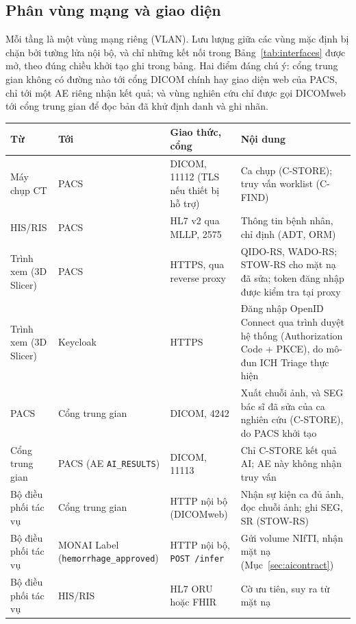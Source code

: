\subsection{Phân vùng mạng và giao diện}
\label{sec:network}

Mỗi tầng là một vùng mạng riêng (VLAN). Lưu lượng giữa các vùng mặc định bị chặn bởi
tường lửa nội bộ, và chỉ những kết nối trong Bảng~\ref{tab:interfaces} được mở, theo
đúng chiều khởi tạo ghi trong bảng. Hai điểm đáng chú ý: cổng trung gian không có
đường nào tới cổng DICOM chính hay giao diện web của PACS, chỉ tới một AE riêng nhận
kết quả; và vùng nghiên cứu chỉ được gọi DICOMweb tới cổng trung gian để đọc bản đã khử
định danh và ghi nhãn.

\begin{table}[H]
\centering
\small
\begin{tabularx}{\textwidth}{@{}p{2.6cm} p{2.6cm} p{3.0cm} Y@{}}
\toprule
\textbf{Từ} & \textbf{Tới} & \textbf{Giao thức, cổng} & \textbf{Nội dung} \\
\midrule
Máy chụp CT & PACS & DICOM, 11112 (TLS nếu thiết bị hỗ trợ) & Ca chụp (C-STORE); truy vấn worklist (C-FIND) \\
HIS/RIS & PACS & HL7 v2 qua MLLP, 2575 & Thông tin bệnh nhân, chỉ định (ADT, ORM) \\
Trình xem (3D Slicer) & PACS & HTTPS, qua reverse proxy & QIDO-RS, WADO-RS; STOW-RS cho mặt nạ đã sửa; token đăng nhập được kiểm tra tại proxy \\
Trình xem (3D Slicer) & Keycloak & HTTPS & Đăng nhập OpenID Connect qua trình duyệt hệ thống (Authorization Code + PKCE), do mô-đun ICH Triage thực hiện \\
PACS & Cổng trung gian & DICOM, 4242 & Xuất chuỗi ảnh, và SEG bác sĩ đã sửa của ca nghiên cứu (C-STORE), do PACS khởi tạo \\
Cổng trung gian & PACS (AE \texttt{AI\_RESULTS}) & DICOM, 11113 & Chỉ C-STORE kết quả AI; AE này không nhận truy vấn \\
Bộ điều phối tác vụ & Cổng trung gian & HTTP nội bộ (DICOMweb) & Nhận sự kiện ca đủ ảnh, đọc chuỗi ảnh; ghi SEG, SR (STOW-RS) \\
Bộ điều phối tác vụ & MONAI Label (\texttt{hemorrhage\_approved}) & HTTP nội bộ, \texttt{POST /infer} & Gửi volume NIfTI, nhận mặt nạ (Mục~\ref{sec:aicontract}) \\
Bộ điều phối tác vụ & HIS/RIS & HL7 ORU hoặc FHIR & Cờ ưu tiên, suy ra từ mặt nạ \\

\end{tabularx}
\end{table}
